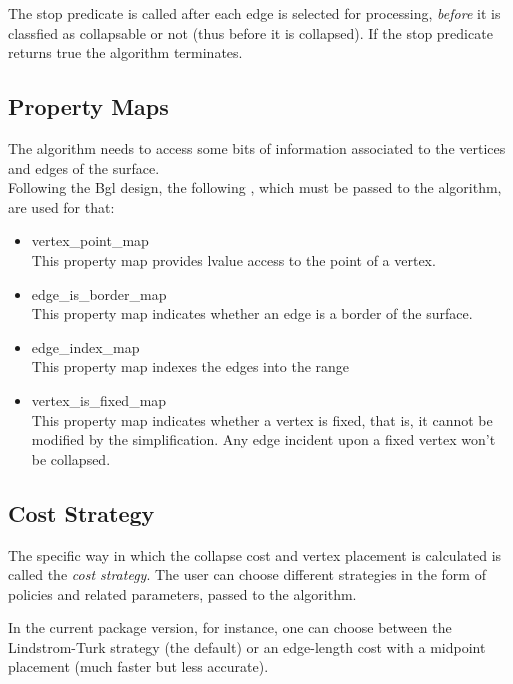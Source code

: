 The stop predicate is called after each edge is selected for processing, {\em before} it is classfied as collapsable or not (thus before it is collapsed). If the stop predicate returns true the algorithm terminates.

\subsection{Property Maps}

The algorithm needs to access some bits of information associated to the vertices and edges of the surface.\\ Following the {\sc Bgl} design, the following
, 
which must be passed to the algorithm, are used for that:

\begin{itemize}

\item vertex_point_map\\
This property map provides lvalue access to the point of a vertex.

\item edge_is_border_map\\
This property map indicates whether an edge is a border of the surface.

\item edge_index_map\\
This property map indexes the edges into the range

\item vertex_is_fixed_map\\
This property map indicates whether a vertex is fixed, that is, it cannot be modified by the
simplification. Any edge incident upon a fixed vertex won't be collapsed.

\end{itemize}

\subsection{Cost Strategy}

The specific way in which the collapse cost and vertex placement is
calculated is called the {\em cost strategy}. The user can choose 
different strategies in the form of policies and related parameters,
passed to the algorithm.
 
In the current package version, for instance,
one can choose between the Lindstrom-Turk strategy 
(the default) or an edge-length cost with a midpoint 
placement (much faster but less accurate).

